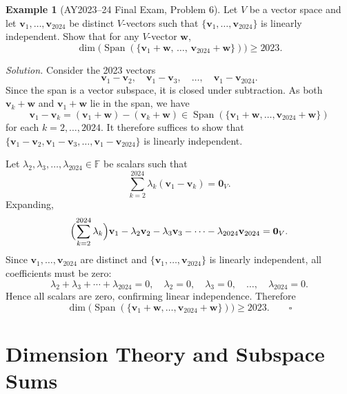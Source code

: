 \documentclass[11pt, a4paper, notitlepage]{report}
\theoremstyle{definition}
\newtheorem{example}[theorem]{Example}
\theoremstyle{remark}
\begin{document}
\begin{example}[AY2023--24 Final Exam, Problem 6]\label{ex:dim-exam-2024}
Let $V$ be a vector space and let $\mathbf{v}_1, \ldots, \mathbf{v}_{2024}$ be distinct $V$-vectors such that $\{\mathbf{v}_1, \ldots, \mathbf{v}_{2024}\}$ is linearly independent. Show that for any $V$-vector $\mathbf{w}$,
\[
  \dim\!\bigl(\operatorname{Span}(\{\mathbf{v}_1+\mathbf{w},\,\ldots,\,\mathbf{v}_{2024}+\mathbf{w}\})\bigr) \ge 2023.
\]

\emph{Solution.} Consider the 2023 vectors
\[
  \mathbf{v}_1 - \mathbf{v}_2,\quad \mathbf{v}_1 - \mathbf{v}_3,\quad \ldots,\quad \mathbf{v}_1 - \mathbf{v}_{2024}.
\]
Since the span is a vector subspace, it is closed under subtraction. As both $\mathbf{v}_k + \mathbf{w}$ and $\mathbf{v}_1 + \mathbf{w}$ lie in the span, we have
\[
  \mathbf{v}_1 - \mathbf{v}_k = (\mathbf{v}_1 + \mathbf{w}) - (\mathbf{v}_k + \mathbf{w}) \in \operatorname{Span}(\{\mathbf{v}_1+\mathbf{w},\ldots,\mathbf{v}_{2024}+\mathbf{w}\})
\]
for each $k = 2, \ldots, 2024$. It therefore suffices to show that $\{\mathbf{v}_1-\mathbf{v}_2, \mathbf{v}_1-\mathbf{v}_3, \ldots, \mathbf{v}_1-\mathbf{v}_{2024}\}$ is linearly independent.

Let $\lambda_2, \lambda_3, \ldots, \lambda_{2024}\in\mathbb{F}$ be scalars such that
\[
  \sum_{k=2}^{2024} \lambda_k (\mathbf{v}_1 - \mathbf{v}_k) = \mathbf{0}_V.
\]
Expanding,
\[
  \Bigl(\sum_{k=2}^{2024}\lambda_k\Bigr)\mathbf{v}_1 - \lambda_2\mathbf{v}_2 - \lambda_3\mathbf{v}_3 - \cdots - \lambda_{2024}\mathbf{v}_{2024} = \mathbf{0}_V.
\]
Since $\mathbf{v}_1, \ldots, \mathbf{v}_{2024}$ are distinct and $\{\mathbf{v}_1, \ldots, \mathbf{v}_{2024}\}$ is linearly independent, all coefficients must be zero:
\[
  \lambda_2 + \lambda_3 + \cdots + \lambda_{2024} = 0, \quad \lambda_2 = 0, \quad \lambda_3 = 0, \quad \ldots,\quad \lambda_{2024} = 0.
\]
Hence all scalars are zero, confirming linear independence. Therefore
\[
  \dim\!\bigl(\operatorname{Span}(\{\mathbf{v}_1+\mathbf{w},\ldots,\mathbf{v}_{2024}+\mathbf{w}\})\bigr) \ge 2023. \qquad\square
\]
\end{example}

\chapter{Dimension Theory and Subspace Sums}
\label{chap:week4}
\end{document}
